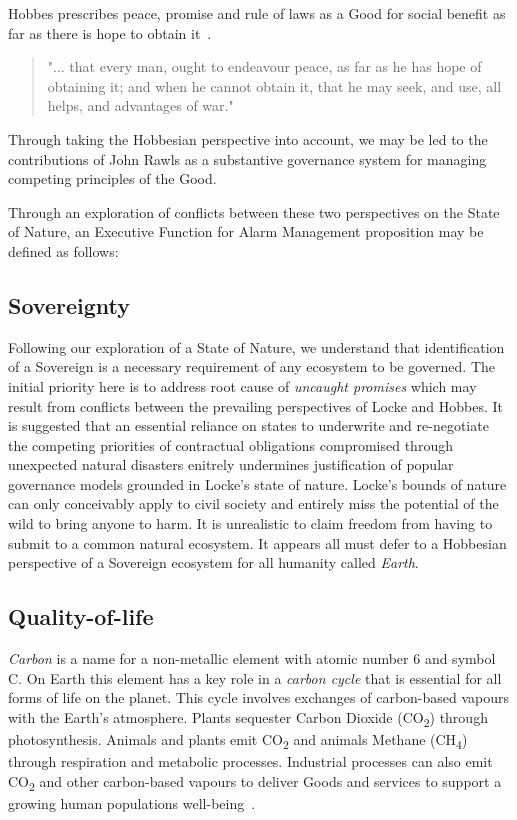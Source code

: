 \documentclass[11pt, oneside]{article}   	%
\begin{document}
Hobbes prescribes peace, promise and rule of laws as a Good for social benefit as far as there is hope to obtain it~\cite{th1}.

\begin{quote}
"... that every man, ought to endeavour peace, as far as he has hope of obtaining it; and when he cannot obtain it, that he may seek, and use, all helps, and advantages of war."
\end{quote}
Through taking the Hobbesian perspective into account, we may be led to the contributions of John Rawls as a substantive governance system for managing competing principles of the Good.\

Through an exploration of conflicts between these two perspectives on the State of Nature, an Executive Function for Alarm Management proposition may be defined as follows:\

\subsection{Sovereignty}
Following our exploration of a State of Nature, we understand that identification of a Sovereign is a necessary requirement of any ecosystem to be governed.
The initial priority here is to address root cause of \emph{uncaught promises} which may result from conflicts between the prevailing perspectives of Locke and Hobbes.
It is suggested that an essential reliance on states to underwrite and re-negotiate the competing priorities of contractual obligations compromised through unexpected natural disasters enitrely undermines justification of popular governance models grounded in Locke's state of nature.
Locke's bounds of nature can only conceivably apply to civil society and entirely miss the potential of the wild to bring anyone to harm.
It is unrealistic to claim freedom from having to submit to a common natural ecosystem.
It appears all must defer to a Hobbesian perspective of a Sovereign ecosystem for all humanity called \emph{Earth}.\

\subsection{Quality-of-life}
\emph{Carbon} is a name for a non-metallic element with atomic number 6 and symbol C.
On Earth this element has a key role in a \emph{carbon cycle} that is essential for all forms of life on the planet.
This cycle involves exchanges of carbon-based vapours with the Earth's atmosphere.
Plants sequester Carbon Dioxide (CO\textsubscript{2}) through photosynthesis.
Animals and plants emit CO\textsubscript{2} and animals Methane (CH\textsubscript{4}) through respiration and metabolic processes.
Industrial processes can also emit CO\textsubscript{2} and other carbon-based vapours to deliver Goods and services to support a growing human populations well-being~\cite{ng1}.\
\end{document}
